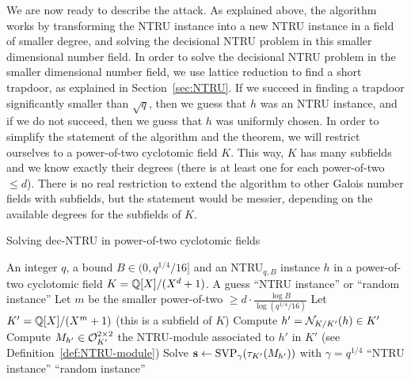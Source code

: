 
We are now ready to describe the attack. As explained above, the algorithm works by transforming the NTRU instance into a new NTRU instance in a field of smaller degree, and solving the decisional NTRU problem in this smaller dimensional number field. In order to solve the decisional NTRU problem in the smaller dimensional number field, we use lattice reduction to find a short trapdoor, as explained in Section~\ref{sec:NTRU}. If we succeed in finding a trapdoor significantly smaller than $\sqrt{q}$, then we guess that $h$ was an NTRU instance, and if we do not succeed, then we guess that $h$ was uniformly chosen.
In order to simplify the statement of the algorithm and the theorem, we will restrict ourselves to a power-of-two cyclotomic field $K$. This way, $K$ has many subfields and we know exactly their degrees (there is at least one for each power-of-two $\leq d$). There is no real restriction to extend the algorithm to other Galois number fields with subfields, but the statement would be messier, depending on the available degrees for the subfields of $K$.

\begin{algorithm}
\caption{Solving dec-NTRU in power-of-two cyclotomic fields}
\label{algo:attack-NTRU}
\begin{algorithmic}[1]
\REQUIRE An integer $q$, a bound $B \in (0,q^{1/4}/16]$ and an NTRU$_{q,B}$ instance $h$ in a power-of-two cyclotomic field $K = \mathbb{Q}[X]/(X^d+1)$.
\ENSURE A guess ``NTRU instance'' or ``random instance'' \vspace{1mm}
\STATE Let $m$ be the smaller power-of-two $\geq d \cdot \frac{\log B}{\log(q^{1/4}/16)}$ \vspace{1mm}
\STATE Let $K' = \mathbb{Q}[X]/(X^m+1)$ {\color{gray}(this is a subfield of $K$)}\vspace{1mm}
\STATE Compute $h' = \mathcal{N}_{K/K'}(h) \in K'$\vspace{1mm}
\STATE Compute $M_{h'} \in \mathcal{O}_{K'}^{2 \times 2}$ the NTRU-module associated to $h'$ in $K'$ (see Definition~\ref{def:NTRU-module})\vspace{1mm}
\STATE Solve $\mathbf s \leftarrow \text{SVP}_\gamma(\tau_{K'}(M_{h'}))$ with $\gamma = q^{1/4}$\vspace{1mm} \label{step:SVP-NTRU}
\label{step:if-small-NTRU}
	\RETURN ``NTRU instance''
\ELSE
	\RETURN ``random instance''
\ENDIF
\end{algorithmic}
\end{algorithm} 


